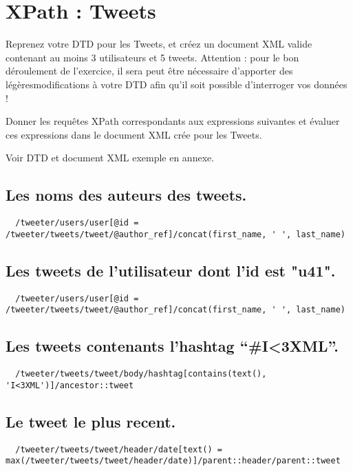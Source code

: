 \chapter{XPath : Tweets}

Reprenez votre DTD pour les Tweets, et créez un document XML valide contenant au moins 3 utilisateurs et 5 tweets. Attention : pour le bon déroulement de l’exercice, il sera peut être nécessaire d’apporter des légèresmodifications à votre DTD afin qu’il soit possible d’interroger vos données !

Donner  les  requêtes  XPath  correspondants  aux  expressions  suivantes  et  évaluer  ces  expressions  dans  le document XML crée pour les Tweets.

Voir DTD et document XML exemple en annexe.

\section{Les noms des auteurs des tweets.}
\begin{verbatim}
  /tweeter/users/user[@id = /tweeter/tweets/tweet/@author_ref]/concat(first_name, ' ', last_name)
\end{verbatim}

\section{Les tweets de l’utilisateur dont l’id est "u41".}
\begin{verbatim}
  /tweeter/users/user[@id = /tweeter/tweets/tweet/@author_ref]/concat(first_name, ' ', last_name)
\end{verbatim}

\section{Les tweets contenants l’hashtag “\#I<3XML”.}
\begin{verbatim}
  /tweeter/tweets/tweet/body/hashtag[contains(text(), 'I<3XML')]/ancestor::tweet
\end{verbatim}

\section{Le tweet le plus recent.}
\begin{verbatim}
  /tweeter/tweets/tweet/header/date[text() = max(/tweeter/tweets/tweet/header/date)]/parent::header/parent::tweet
\end{verbatim}

